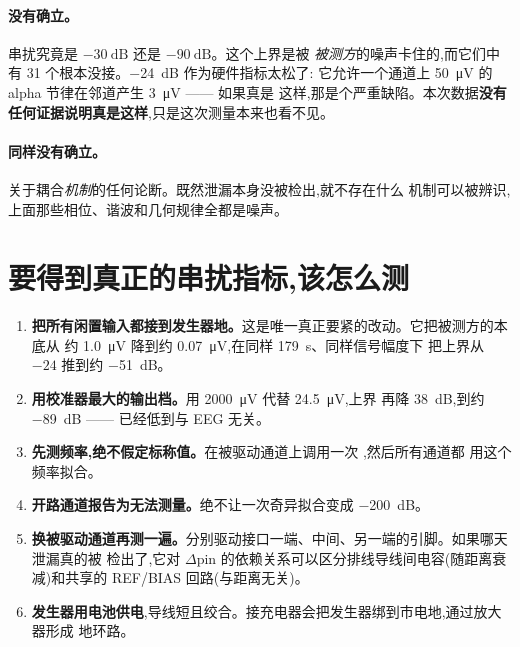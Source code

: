 \documentclass[11pt]{ctexart}
\begin{document}
\paragraph{没有确立。}串扰究竟是 $-\SI{30}{\deci\bel}$ 还是 $-\SI{90}{\deci\bel}$。这个上界是被
\emph{被测方}的噪声卡住的,而它们中有 31 个根本没接。\SI{-24}{\deci\bel} 作为硬件指标太松了:
它允许一个通道上 \SI{50}{\micro\volt} 的 alpha 节律在邻道产生 \SI{3}{\micro\volt} —— 如果真是
这样,那是个严重缺陷。本次数据\textbf{没有任何证据说明真是这样},只是这次测量本来也看不见。

\paragraph{同样没有确立。}关于耦合\emph{机制}的任何论断。既然泄漏本身没被检出,就不存在什么
机制可以被辨识,上面那些相位、谐波和几何规律全都是噪声。

\section{要得到真正的串扰指标,该怎么测}
\label{sec:protocol}

\begin{enumerate}
\item \textbf{把所有闲置输入都接到发生器地。}这是唯一真正要紧的改动。它把被测方的本底从
约 \SI{1.0}{\micro\volt} 降到约 \SI{0.07}{\micro\volt},在同样 \SI{179}{\second}、同样信号幅度下
把上界从 $-24$ 推到约 \SI{-51}{\deci\bel}。

\item \textbf{用校准器最大的输出档。}用 \SI{2000}{\micro\volt} 代替 \SI{24.5}{\micro\volt},上界
再降 \SI{38}{\deci\bel},到约 \SI{-89}{\deci\bel} —— 已经低到与 EEG 无关。

\item \textbf{先测频率,绝不假定标称值。}在被驱动通道上调用一次 ,然后所有通道都
用这个频率拟合。

\item \textbf{开路通道报告为无法测量。}绝不让一次奇异拟合变成 \SI{-200}{\deci\bel}。

\item \textbf{换被驱动通道再测一遍。}分别驱动接口一端、中间、另一端的引脚。如果哪天泄漏真的被
检出了,它对 $\Delta\text{pin}$ 的依赖关系可以区分排线导线间电容(随距离衰减)和共享的
REF/BIAS 回路(与距离无关)。

\item \textbf{发生器用电池供电},导线短且绞合。接充电器会把发生器绑到市电地,通过放大器形成
地环路。
\end{enumerate}
\end{document}
